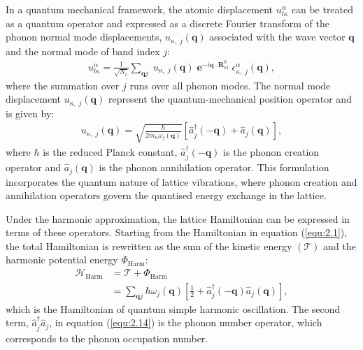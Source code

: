 In a quantum mechanical framework, the atomic displacement $u^{\alpha}_{l\kappa}$ can be treated as a quantum operator and expressed as a discrete Fourier transform of the phonon normal mode displacements, $u_{\kappa,\;j}(\mathbf{q})$ associated with the wave vector $\mathbf{q}$ and the normal mode of band index $j$: 
\begin{equation}
\label{equ:2.12}
    \begin{split}
         u^{\alpha}_{l\kappa} = \frac{1}{\sqrt{N_{l}}}\sum_{\mathbf{q}j}\;u_{\kappa,\;j}(\mathbf{q})\;\textbf{e}^{-i\mathbf{q}\cdot\mathbf{R}^{0}_{\kappa l}}\;\epsilon^{\alpha}_{\kappa,\;j}(\mathbf{q}),
    \end{split}
\end{equation}
where the summation over $j$ runs over all phonon modes.
The normal mode displacement $u_{\kappa,\;j}(\mathbf{q})$ represent the quantum-mechanical position operator and is given by:
\begin{equation}
\label{equ:2.13}
    \begin{split}
         u_{\kappa,\;j}(\mathbf{q}) = \sqrt{\frac{\hbar}{2m_{\kappa}\omega_{j}(\mathbf{q})}}\left[\hat{a}^\dagger_{j}(\mathbf{-q})+\hat{a}_{j}(\mathbf{q})\right],
    \end{split}
\end{equation}
where $\hbar$ is the reduced Planck constant, $\hat{a}^\dagger_{j}(\mathbf{-q})$ is the phonon creation operator and $\hat{a}_{j}(\mathbf{q})$ is the phonon annihilation operator.
This formulation incorporates the quantum nature of lattice vibrations, where phonon creation and annihilation operators govern the quantised energy exchange in the lattice.

Under the harmonic approximation, the lattice Hamiltonian can be expressed in terms of these operators.
Starting from the Hamiltonian in equation (\ref{equ:2.1}), the total Hamiltonian is rewritten as the sum of the kinetic energy $(\mathcal{T})$ and the harmonic potential energy $\Phi_{\text{Harm}}$:
\begin{equation}
\label{equ:2.14}
    \begin{split}
       \mathcal{H}_{\text{Harm}} &= \mathcal{T}+\Phi_{\text{Harm}}\\
       &=\sum_{\mathbf{q}j}\hbar\omega_{j}(\mathbf{q})\left[\frac{1}{2}+\hat{a}^\dagger_{j}(\mathbf{-q})\hat{a}_{j}(\mathbf{q})\right],
    \end{split}
\end{equation}
which is the Hamiltonian of quantum simple harmonic oscillation.
The second term, $\hat{a}^\dagger_{j}\hat{a}_{j}$, in equation (\ref{equ:2.14}) is the phonon number operator, which corresponds to the phonon occupation number.

